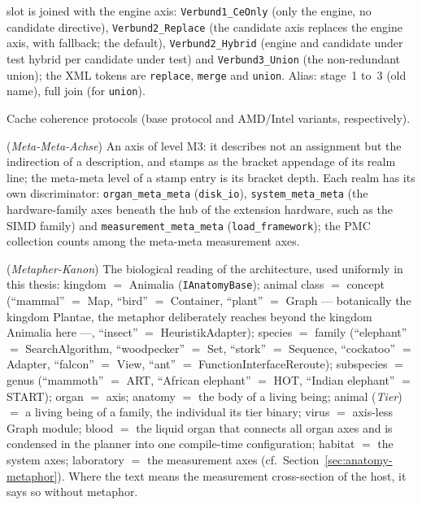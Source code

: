 \begin{description}
  slot is joined with the engine axis: \texttt{Verbund1\_CeOnly} (only the engine, no candidate
  directive), \texttt{Verbund2\_Replace} (the candidate axis replaces the engine axis, with fallback;
  the default), \texttt{Verbund2\_Hybrid} (engine and candidate under test hybrid per candidate
  under test) and
  \texttt{Verbund3\_Union} (the non-redundant union); the XML tokens are \texttt{replace},
  \texttt{merge} and \texttt{union}. Alias: stage~1 to~3 (old name), full join (for
  \texttt{union}).
  \item[MESI, MOESI, MESIF] Cache coherence protocols (base protocol and AMD/Intel variants,
  respectively).
  \item[Meta-meta axis] (\emph{Meta-Meta-Achse}) An axis of level M3: it describes not an
  assignment but the indirection of a description, and stamps as the bracket appendage of its realm
  line; the meta-meta level of a stamp entry is its bracket depth. Each realm has its own
  discriminator: \texttt{organ\_meta\_meta} (\texttt{disk\_io}), \texttt{system\_meta\_meta} (the
  hardware-family axes beneath the hub of the extension hardware, such as the SIMD family) and
  \texttt{measurement\_meta\_meta} (\texttt{load\_framework}); the PMC collection counts among the
  meta-meta measurement axes.
  \item[Metaphor canon] (\emph{Metapher-Kanon}) The biological reading of the architecture, used
  uniformly in this thesis: kingdom $=$ Animalia (\texttt{IAnatomyBase}); animal class $=$ concept
  (\enquote{mammal} $=$ Map, \enquote{bird} $=$ Container, \enquote{plant} $=$ Graph --- botanically
  the kingdom Plantae, the metaphor deliberately reaches beyond the kingdom Animalia here ---,
  \enquote{insect} $=$ HeuristikAdapter); species $=$ family (\enquote{elephant} $=$ SearchAlgorithm,
  \enquote{woodpecker} $=$ Set, \enquote{stork} $=$ Sequence, \enquote{cockatoo} $=$ Adapter,
  \enquote{falcon} $=$ View, \enquote{ant} $=$ FunctionInterfaceReroute); subspecies $=$ genus
  (\enquote{mammoth} $=$ ART, \enquote{African elephant} $=$ HOT, \enquote{Indian elephant} $=$
  START); organ $=$ axis; anatomy $=$ the body of a living being; animal (\emph{Tier}) $=$ a living
  being of a family, the individual its tier binary; virus $=$ axis-less Graph module; blood $=$
  the liquid organ that connects all organ axes and is condensed in the planner into one
  compile-time configuration; habitat $=$ the system axes; laboratory $=$ the measurement axes
  (cf.\ Section~\ref{sec:anatomy-metaphor}). Where the text means the
  measurement cross-section of the host, it says so without metaphor.

\end{description}

